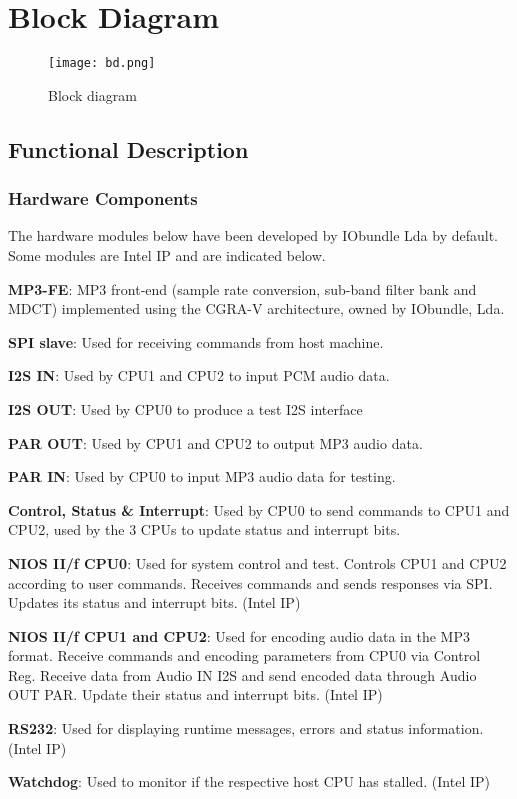 \documentclass{ug}
\theoremstyle{plain}
\begin{document}
\clearpage

\section{Block Diagram}
\label{sec:bd}

\begin{figure}[h]
  \begin{center}
    \texttt{[image: bd.png]}
    \caption{Block diagram}
    \label{fig:bd}
  \end{center}
\end{figure}
\clearpage

\subsection{Functional Description}
\label{sec:func}

\subsubsection{Hardware Components}

The hardware modules below have been developed by IObundle Lda by default. Some
modules are Intel IP and are indicated below.

\begin{description}
\item {\bf MP3-FE}: MP3 front-end (sample rate conversion, sub-band filter bank
  and MDCT) implemented using the CGRA-V architecture, owned by IObundle, Lda.
\item {\bf SPI slave}: Used for receiving commands from host machine.
\item {\bf I2S IN}: Used by CPU1 and CPU2 to input PCM audio data.
\item {\bf I2S OUT}: Used by CPU0 to produce a test I2S interface
\item {\bf PAR OUT}: Used by CPU1 and CPU2 to output MP3 audio data.
\item {\bf PAR IN}: Used by CPU0 to input MP3 audio data for testing.
\item {\bf Control, Status \& Interrupt}: Used by CPU0 to send commands to CPU1
  and CPU2, used by the 3 CPUs to update status and interrupt bits.
\item {\bf NIOS II/f CPU0}: Used for system control and test. Controls CPU1 and
  CPU2 according to user commands. Receives commands and sends
  responses via SPI. Updates its status and interrupt bits. (Intel IP)
\item {\bf NIOS II/f CPU1 and CPU2}: Used for encoding audio data in the MP3
  format. Receive commands and encoding parameters from CPU0 via Control
  Reg. Receive data from Audio IN I2S and send encoded data through Audio OUT
  PAR. Update their status and interrupt bits. (Intel IP)
\item {\bf RS232}: Used for displaying runtime messages, errors and status
  information. (Intel IP)
\item {\bf Watchdog}: Used to monitor if the respective host CPU has
  stalled. (Intel IP)
\end{description}
\end{document}
